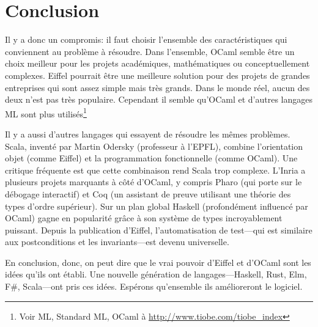 \documentclass[french]{report}
\begin{document}
\chapter{Conclusion}

Il y a donc un compromis: il faut choisir l'ensemble des caractéristiques qui conviennent au problème à résoudre. Dans l'ensemble, OCaml semble être un choix meilleur pour les projets académiques, mathématiques ou conceptuellement complexes. Eiffel pourrait être une meilleure solution pour des projets de grandes entreprises qui sont assez simple mais très grands. Dans le monde réel, aucun des deux n'est pas très populaire. Cependant il semble qu'OCaml et d'autres langages ML sont plus utilisés\footnote{Voir ML, Standard ML, OCaml à \url{http://www.tiobe.com/tiobe_index}}

Il y a aussi d'autres langages qui essayent de résoudre les mêmes problèmes. Scala, inventé par Martin Odersky (professeur à l'EPFL), combine l'orientation objet (comme Eiffel) et la programmation fonctionnelle (comme OCaml). Une critique fréquente est que cette combinaison rend Scala trop complexe. L'Inria a plusieurs projets marquants à côté d'OCaml, y compris Pharo (qui porte sur le débogage interactif) et Coq (un assistant de preuve utilisant une théorie des types d'ordre supérieur). Sur un plan global Haskell (profondément influencé par OCaml) gagne en popularité grâce à son système de types incroyablement puissant. Depuis la publication d'Eiffel, l'automatisation de test---qui est similaire aux postconditions et les invariants---est devenu universelle.

En conclusion, donc, on peut dire que le vrai pouvoir d'Eiffel et d'OCaml sont les idées qu'ils ont établi. Une nouvelle génération de langages---Haskell, Rust, Elm, F\#, Scala---ont pris ces idées. Espérons qu'ensemble ils amélioreront le logiciel.
\end{document}
